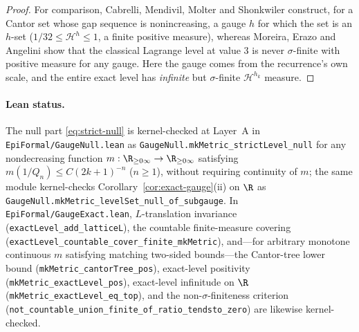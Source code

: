 \begin{proof}
For comparison, Cabrelli, Mendivil, Molter and Shonkwiler
\cite[\S5, Theorem~3]{CMMS} construct, for a Cantor set whose gap
sequence is nonincreasing, a gauge $h$ for which the set is an $h$-set
($1/32\le\mathcal H^h\le1$, a finite positive measure), whereas Moreira, Erazo
and Angelini \cite{MEA} show that the classical Lagrange level at value $3$ is
never $\sigma$-finite with positive measure for any gauge. Here the gauge comes
from the recurrence's own scale, and the entire exact level has \emph{infinite}
but $\sigma$-finite $\mathcal H^{h_k}$ measure.
\end{proof}

\paragraph{Lean status.}
The null part \eqref{eq:strict-null} is kernel-checked at Layer~A in
\texttt{EpiFormal/\allowbreak GaugeNull.lean} as
\texttt{GaugeNull.\allowbreak mkMetric\_\allowbreak strictLevel\_\allowbreak null}
for any nondecreasing function $m:\R_{\ge0\infty}\to\R_{\ge0\infty}$ satisfying
$m(1/Q_n)\le C(2k+1)^{-n}$ ($n\ge1$), without requiring continuity of $m$; the
same module kernel-checks Corollary~\ref{cor:exact-gauge}(ii) on $\R$ as
\texttt{GaugeNull.\allowbreak mkMetric\_\allowbreak levelSet\_\allowbreak null\_\allowbreak of\_\allowbreak subgauge}.
In \texttt{EpiFormal/\allowbreak GaugeExact.lean}, $L$-translation invariance
(\texttt{exactLevel\_\allowbreak add\_\allowbreak latticeL}), the countable
finite-measure covering
(\texttt{exactLevel\_\allowbreak countable\_\allowbreak cover\_\allowbreak finite\_\allowbreak mkMetric}),
and---for arbitrary monotone continuous $m$ satisfying matching two-sided
bounds---the Cantor-tree lower bound
(\texttt{mkMetric\_\allowbreak cantorTree\_\allowbreak pos}), exact-level
positivity (\texttt{mkMetric\_\allowbreak exactLevel\_\allowbreak pos}),
exact-level infinitude on $\R$
(\texttt{mkMetric\_\allowbreak exactLevel\_\allowbreak eq\_\allowbreak top}),
and the non-$\sigma$-finiteness criterion
(\texttt{not\_\allowbreak countable\_\allowbreak union\_\allowbreak finite\_\allowbreak of\_\allowbreak ratio\_\allowbreak tendsto\_\allowbreak zero})
are likewise kernel-checked.

